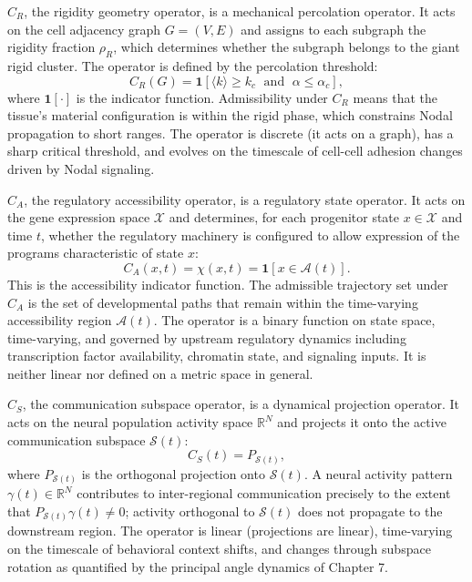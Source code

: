 \documentclass[12pt, a4paper, openany]{book}
\theoremstyle{definition}
\theoremstyle{remark}
\begin{document}
\begin{appendices}
$C_R$, the rigidity geometry operator, is a mechanical percolation operator. It acts on the cell adjacency graph $G = (V,E)$ and assigns to each subgraph the rigidity fraction $\rho_R$, which determines whether the subgraph belongs to the giant rigid cluster. The operator is defined by the percolation threshold:
\begin{equation}
C_R(G) = \mathbf{1}[\langle k \rangle \geq k_c \;\text{ and }\; \alpha \leq \alpha_c],
\end{equation}
where $\mathbf{1}[\cdot]$ is the indicator function. Admissibility under $C_R$ means that the tissue's material configuration is within the rigid phase, which constrains Nodal propagation to short ranges. The operator is discrete (it acts on a graph), has a sharp critical threshold, and evolves on the timescale of cell-cell adhesion changes driven by Nodal signaling.

$C_A$, the regulatory accessibility operator, is a regulatory state operator. It acts on the gene expression space $\mathcal{X}$ and determines, for each progenitor state $x \in \mathcal{X}$ and time $t$, whether the regulatory machinery is configured to allow expression of the programs characteristic of state $x$:
\begin{equation}
C_A(x,t) = \chi(x,t) = \mathbf{1}[x \in \mathcal{A}(t)].
\end{equation}
This is the accessibility indicator function. The admissible trajectory set under $C_A$ is the set of developmental paths that remain within the time-varying accessibility region $\mathcal{A}(t)$. The operator is a binary function on state space, time-varying, and governed by upstream regulatory dynamics including transcription factor availability, chromatin state, and signaling inputs. It is neither linear nor defined on a metric space in general.

$C_S$, the communication subspace operator, is a dynamical projection operator. It acts on the neural population activity space $\mathbb{R}^N$ and projects it onto the active communication subspace $\mathcal{S}(t)$:
\begin{equation}
C_S(t) = P_{\mathcal{S}(t)},
\end{equation}
where $P_{\mathcal{S}(t)}$ is the orthogonal projection onto $\mathcal{S}(t)$. A neural activity pattern $\gamma(t) \in \mathbb{R}^N$ contributes to inter-regional communication precisely to the extent that $P_{\mathcal{S}(t)}\gamma(t) \neq 0$; activity orthogonal to $\mathcal{S}(t)$ does not propagate to the downstream region. The operator is linear (projections are linear), time-varying on the timescale of behavioral context shifts, and changes through subspace rotation as quantified by the principal angle dynamics of Chapter 7.


\end{appendices}
\end{document}
